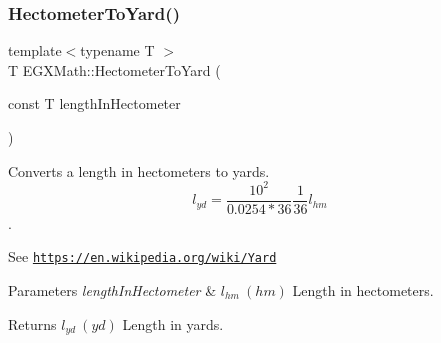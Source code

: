 \subsubsection{\texorpdfstring{Hectometer\+To\+Yard()}{HectometerToYard()}}
{\footnotesize\ttfamily template$<$typename T $>$ \\
T E\+G\+X\+Math\+::\+Hectometer\+To\+Yard (\begin{DoxyParamCaption}\item[{const T}]{length\+In\+Hectometer }\end{DoxyParamCaption})}



Converts a length in hectometers to yards. \[ l_{yd}= \frac{10^{2}}{0.0254 * 36} \frac{1}{36} l_{hm} \]. 

See \href{https://en.wikipedia.org/wiki/Yard}{\tt https\+://en.\+wikipedia.\+org/wiki/\+Yard} 
\begin{DoxyParams}{Parameters}
{\em length\+In\+Hectometer} & $ l_{hm}\ (hm)$ Length in hectometers. \\
\hline
\end{DoxyParams}
\begin{DoxyReturn}{Returns}
$ l_{yd}\ (yd)$ Length in yards. 
\end{DoxyReturn}

